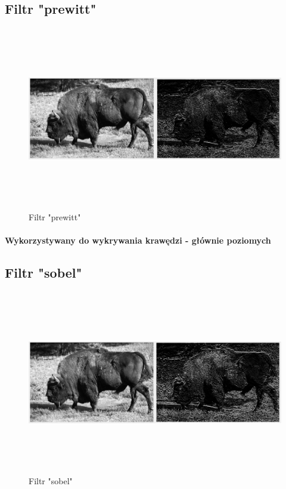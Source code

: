 \documentclass[a4paper,12pt]{article}
\begin{document}
\begin{justify}
\newpage

\subsection{Filtr "prewitt"}

\begin{figure}[h!]
\centering
\includegraphics[width=18cm, height=8cm]{8}
\caption{Filtr "prewitt"}
\end{figure}

\paragraph{Wykorzystywany do wykrywania krawędzi - głównie poziomych}

\newpage

\subsection{Filtr "sobel"}

\begin{figure}[h!]
\centering
\includegraphics[width=18cm, height=8cm]{9}
\caption{Filtr "sobel"}
\end{figure}


\end{justify}
\end{document}
